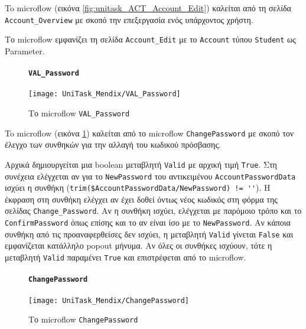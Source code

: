                     To microflow (εικόνα \ref{fig:unitask_ACT_Account_Edit}) καλείται από τη σελίδα \texttt{Account\_Overview} με σκοπό την επεξεργασία ενός υπάρχοντος χρήστη.

                    Το microflow εμφανίζει τη σελίδα \texttt{Account\_Edit} με το \texttt{Account} τύπου \texttt{Student} ως Parameter.

                \begin{figure}[H] \noindent
                    \paragraph{\texttt{VAL\_Password}}
                    \begin{center}
                        \texttt{[image: UniTask\_Mendix/VAL\_Password]}
                        \caption{\centering Το microflow \texttt{VAL\_Password}}
                        \label{fig:unitask_VAL_Password}
                    \end{center}
                \end{figure}

                    To microflow (εικόνα \ref{fig:unitask_VAL_Password}) καλείται από το microflow \texttt{ChangePassword} με σκοπό τον έλεγχο των συνθηκών για την αλλαγή του κωδικού πρόσβασης.

                    Αρχικά δημιουργείται μια boolean μεταβλητή \texttt{Valid} με αρχική τιμή \texttt{True}. Στη συνέχεια ελέγχεται αν για το \texttt{NewPassword} του αντικειμένου \texttt{AccountPasswordData} ισχύει η συνθήκη (\verb|trim($AccountPasswordData/NewPassword) != ''|). Η έκφραση στη συνθήκη ελέγχει αν έχει δοθεί όντως νέος κωδικός στη φόρμα της σελίδας \texttt{Change\_Password}. Αν η συνθήκη ισχύει, ελέγχεται με παρόμοιο τρόπο και το \texttt{ConfirmPassword} όπως επίσης και το αν είναι ίσο με το \texttt{NewPassword}. Αν κάποια συνθήκη από τις προαναφερθείσες δεν ισχύει, η μεταβλητή \texttt{Valid} γίνεται \texttt{False} και εμφανίζεται κατάλληλο popout μήνυμα. Αν όλες οι συνθήκες ισχύουν, τότε η μεταβλητή \texttt{Valid} παραμένει \texttt{True} και επιστρέφεται από το microflow.

                \begin{figure}[H] \noindent
                    \paragraph{\texttt{ChangePassword}}
                    \begin{center}
                        \texttt{[image: UniTask\_Mendix/ChangePassword]}
                        \caption{\centering Tο microflow \texttt{ChangePassword}}
                        \label{fig:unitask_ChangePassword}
                    \end{center}
                \end{figure}

